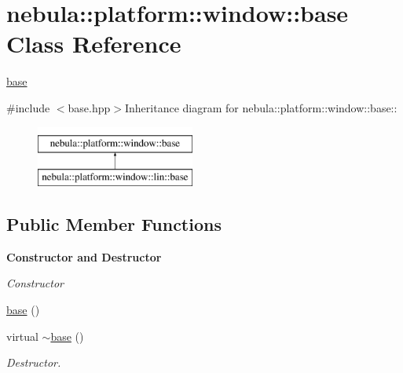 \hypertarget{classnebula_1_1platform_1_1window_1_1base}{
\section{nebula::platform::window::base Class Reference}
\label{classnebula_1_1platform_1_1window_1_1base}
}


\hyperlink{classnebula_1_1platform_1_1window_1_1base}{base}  


{\ttfamily \#include $<$base.hpp$>$}Inheritance diagram for nebula::platform::window::base::\begin{figure}[H]
\begin{center}
\leavevmode
\includegraphics[height=2cm]{classnebula_1_1platform_1_1window_1_1base}
\end{center}
\end{figure}
\subsection*{Public Member Functions}
\begin{Indent}{\bf Constructor and Destructor}\par
{\em \label{_amgrp65b93122a8e010d8931d904429460f59}
 Constructor }\begin{DoxyCompactItemize}
\item 
\hyperlink{classnebula_1_1platform_1_1window_1_1base_afcbf9d5d846a10cce5ebf100e1abbca1}{base} ()
\item 
virtual \hyperlink{classnebula_1_1platform_1_1window_1_1base_a40f1250dd3383ad57200c65e969d3e5b}{$\sim$base} ()
\begin{DoxyCompactList}\small\item\em Destructor. \item\end{DoxyCompactList}\end{DoxyCompactItemize}
\end{Indent}
